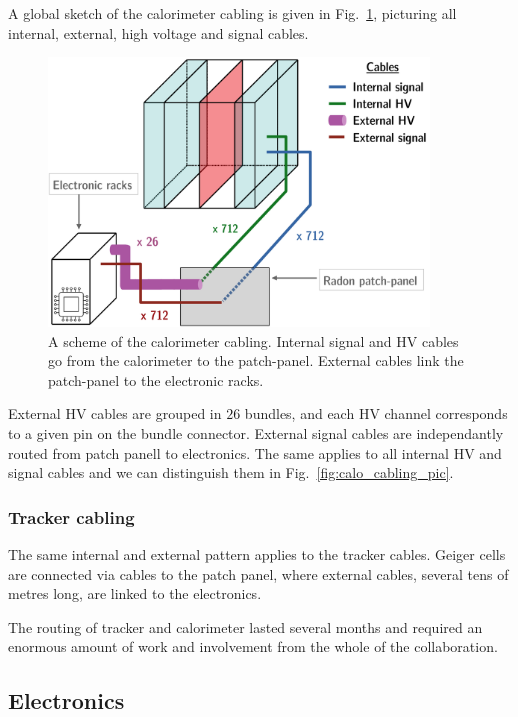 A global sketch of the calorimeter cabling is given in Fig.~\ref{fig:calo_cabling}, picturing all internal, external, high voltage and signal cables.
\begin{figure}[h]
  \centering
  \includegraphics[width=0.9\textwidth]{SNdemonstrator/fig_SNdemonstrator/calo_cabling.pdf}
  \caption{A scheme of the calorimeter cabling.
    Internal signal and HV cables go from the calorimeter to the patch-panel.
    External cables link the patch-panel to the electronic racks.
    \label{fig:calo_cabling}}
\end{figure}
External HV cables are grouped in $26$ bundles, and each HV channel corresponds to a given pin on the bundle connector.
External signal cables are independantly routed from patch panell to electronics.
The same applies to all internal HV and signal cables and we can distinguish them in Fig.~\ref{fig:calo_cabling_pic}.

\subsubsection*{Tracker cabling}

The same internal and external pattern applies to the tracker cables.
Geiger cells are connected via cables to the patch panel, where external cables, several tens of metres long, are linked to the electronics.

The routing of tracker and calorimeter lasted several months and required an enormous amount of work and involvement from the whole of the collaboration.

\subsection{Electronics}

